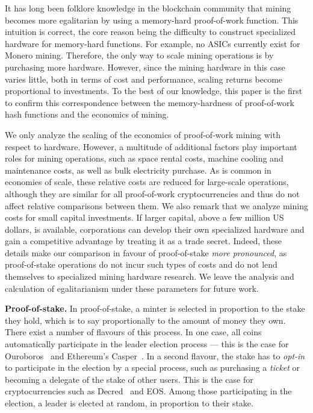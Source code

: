 It has long been folklore knowledge in the blockchain community that mining
becomes more egalitarian by using a memory-hard proof-of-work function. This
intuition is correct, the core reason being the difficulty to construct
specialized hardware for memory-hard functions. For example, no ASICs
currently exist for Monero mining.  Therefore, the only way to scale mining
operations is by purchasing more hardware. However, since the mining hardware
in this case varies little, both in terms of cost and performance, scaling
returns become proportional to investments.  To the best of our knowledge, this
paper is the first to confirm this correspondence between the
memory-hardness of proof-of-work hash functions and the economics of mining.

\begin{remark}\label{rmk:pow-scale}
We only analyze the scaling of the economics of proof-of-work mining with
respect to hardware. However, a multitude of
additional factors play important roles for mining operations, such as
space rental costs, machine cooling and maintenance costs, as well as bulk
electricity purchase.  As is common in economies of scale, these relative
costs are reduced for large-scale operations, although they are similar for
all proof-of-work cryptocurrencies and thus do not affect relative
comparisons between them. We also remark that we analyze mining costs for
small capital investments. If larger capital, \eg above a few million US
dollars, is available, corporations can develop their own specialized
hardware and gain a competitive advantage by treating it as a trade secret.
Indeed, these details make our comparison in favour of proof-of-stake
\emph{more pronounced}, as proof-of-stake operations do not incur such
types of costs and do not lend themselves to specialized mining hardware
research. We leave the analysis and calculation of egalitarianism under
these parameters for future work.
\end{remark}

\noindent\textbf{Proof-of-stake.}
In proof-of-stake, a minter is selected in proportion to the stake they hold,
which is to say proportionally to the amount of money they own. There exist a
number of flavours of this process. In one case, all coins automatically
participate in the leader election process --- this is the case for Ouroboros~\cite{C:KRDO17} and
Ethereum's Casper~\cite{buterin2017casper}. In a second flavour, the stake has
to \emph{opt-in} to participate in the election by a special process, such as
purchasing a \emph{ticket} or becoming a delegate of the stake of other users.
This is the case for cryptocurrencies such as Decred~\cite{decred} and EOS. Among those
participating in the election, a leader is elected at random, in proportion to
their stake.

